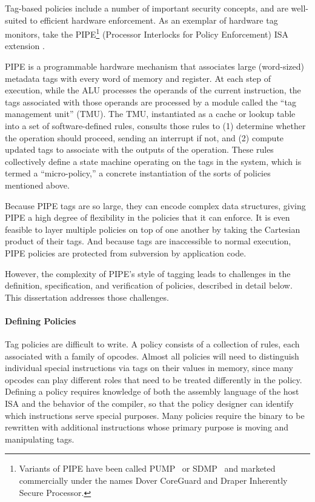 \documentclass{report}
\begin{document}
Tag-based policies include a number of important security concepts, and are well-suited to
efficient hardware enforcement. As an exemplar of hardware tag monitors, take the 
PIPE\footnote{ Variants of PIPE have
been called PUMP~\cite{Dhawan+15} or SDMP~\cite{RoesslerD18} and marketed commercially
under the names Dover CoreGuard and Draper Inherently Secure Processor.}
(Processor Interlocks for Policy Enforcement) ISA extension \cite{Azevedo+16,Azevedo+15}.

PIPE is a programmable hardware mechanism that associates large (word-sized) metadata tags
with every word of memory and register. At each step of execution, while the ALU processes
the operands of the current instruction, the tags associated with those operands are processed
by a module called the ``tag management unit'' (TMU).
The TMU, instantiated as a cache or lookup table into a set of software-defined rules,
consults those rules to (1) determine whether the operation should
proceed, sending an interrupt if not, and (2) compute updated tags to associate with the
outputs of the operation. These rules collectively define a state machine operating on the
tags in the system, which is termed a ``micro-policy,'' a concrete instantiation of the
sorts of policies mentioned above.

Because PIPE tags are so large, they can encode complex data structures, giving PIPE a high
degree of flexibility in the policies that it can enforce. It is even feasible to layer
multiple policies on top of one another by taking the Cartesian product of their tags.
And because tags are inaccessible to normal execution, PIPE policies are protected from
subversion by application code.

However, the complexity of PIPE's style of tagging leads to challenges in the definition,
specification, and verification of policies, described in detail below. This dissertation
addresses those challenges.

\paragraph{Defining Policies}

Tag policies are difficult to write.
A policy consists of a collection of rules, each associated with a family of opcodes.
Almost all policies will need to distinguish
individual special instructions via tags on their values in memory, since many opcodes can
play different roles that need to be
treated differently in the policy. Defining a policy requires knowledge of both the assembly
language of the host ISA and the behavior of the compiler, so that the policy designer can
identify which instructions serve special purposes. Many policies require the binary
to be rewritten with additional instructions whose primary purpose is moving and manipulating
tags.
\end{document}
